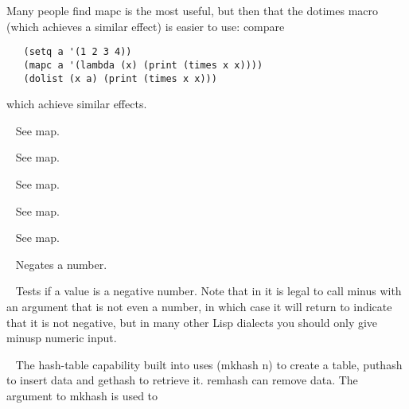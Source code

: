 \begin{description}
Many people find {\tx mapc} is the most useful, but then that the
{\tx dotimes} macro (which achieves a similar effect) is easier to use:
compare
{\small\begin{verbatim}
   (setq a '(1 2 3 4))
   (mapc a '(lambda (x) (print (times x x))))
   (dolist (x a) (print (times x x)))
\end{verbatim}}
\noindent which achieve similar effects.
\item[{\tx mapc~~~~~~~~~} \hspace{1cm} {\em function 2 args}]~\newline
See {\tx map}.
\item[{\tx mapcan~~~~~~~} \hspace{1cm} {\em function 2 args}]~\newline
See {\tx map}.
\item[{\tx mapcar~~~~~~~} \hspace{1cm} {\em function 2 args}]~\newline
See {\tx map}.
\item[{\tx mapcon~~~~~~~} \hspace{1cm} {\em function 2 args}]~\newline
See {\tx map}.
\item[{\tx maplist~~~~~~} \hspace{1cm} {\em function 2 args}]~\newline
See {\tx map}.
\item[{\tx minus~~~~~~~~} \hspace{1cm} {\em function 1 arg}]~\newline
Negates a number.
\item[{\tx minusp~~~~~~~} \hspace{1cm} {\em function 1 arg}]~\newline
Tests if a value is a negative number. Note that in \vsl{} it is legal
to call {\tx minus} with an argument that is not even a number, in which
case it will return \nil{} to indicate that it is not negative, but in many
other Lisp dialects you should only give {\tx minusp} numeric input.
\item[{\tx mkhash~~~~~~~} \hspace{1cm} {\em function 1 arg}]~\newline
The hash-table capability built into \vsl{} uses {\tx (mkhash n)} to create
a table, {\tx puthash} to insert data and {\tx gethash} to retrieve
it. {\tx remhash} can remove data. The argument to {\tx mkhash} is used to

\end{description}
